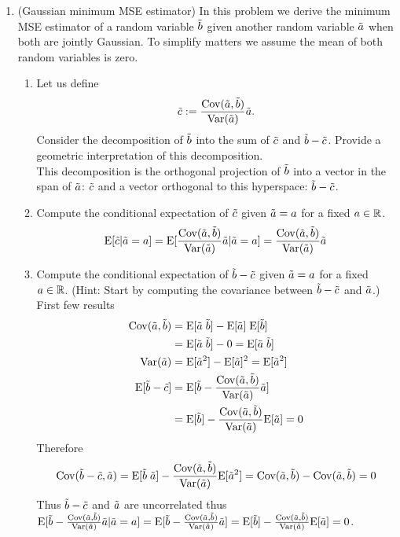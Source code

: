 \documentclass[12pt,twoside]{article}
\begin{document}
\begin{enumerate}
\begin{enumerate}
\begin{proof}
\end{proof}

\end{enumerate}

\item (Gaussian minimum MSE estimator) In this problem we derive the minimum MSE estimator of a random variable $\tilde{ b }$ given another random variable $\tilde{ a }$ when both are jointly Gaussian. To simplify matters we assume the mean of both random variables is zero. 
  \begin{enumerate}
  \item Let us define
  \begin{align}
  \rnd{c} := \frac{\cov(\ra,\rb)}{\var(\ra)}\ra.
  \end{align}
  Consider the decomposition of $\tilde{ b }$ into the sum of $\tilde{ c } $ and $\tilde{  b } - \tilde{ c }$. Provide a geometric interpretation of this decomposition. \\
  This decomposition is the orthogonal projection of $\tilde{ b }$ into a vector in the span of $\tilde{ a }$: $\tilde{ c }$ and a vector orthogonal to this hyperspace:  $\tilde{  b } - \tilde{ c }$.
  
  \item Compute the conditional expectation of $\tilde{ c } $ given $\tilde{  a }=a$ for a fixed $a \in \mathbb{R}$.
  $$\E[\rnd{c} | \rnd{a}= a] = \E[\frac{\cov(\ra,\rb)}{\var(\ra)}\ra | \ra= a] = \frac{\cov(\ra,\rb)}{\var(\ra)}\ra$$
  
  \item Compute the conditional expectation of $\tilde{  b } - \tilde{ c }$ given $\tilde{  a }=a$ for a fixed $a \in \mathbb{R}$. (Hint: Start by computing the covariance between $\tilde{  b } - \tilde{ c }$ and $\tilde{  a }$.)
  First few results
  \begin{align*}
  	\cov(\ra, \rb)	&=	 \E[\ra \; \rb]	- \E[\ra] \; \E[\rb]	\\
				&=	 \E[\ra \; \rb] - 0 = \E[\ra \; \rb] 		\\
	\var(\ra)		&=	 \E[\ra^2] - \E[\ra]^2 =  \E[\ra^2]		\\
	\E[\rb  - \rnd{c}]	&= 	 \E[ \rb  - \frac{\cov(\ra,\rb)}{\var(\ra)}\ra] \\
				&=	 \E[ \rb] - \frac{\cov(\ra,\rb)}{\var(\ra)} \E[\ra] = 0 
  \end{align*}
  Therefore $$\cov(\rb  - \rnd{c}, \ra)   = \E[ \rb  \; \ra] -  \frac{\cov(\ra,\rb)}{\var(\ra)} \E[\ra^2]  = \cov(\ra, \rb) - \cov(\ra, \rb) = 0$$
  Thus  $\tilde{  b }  - \tilde{ c }$ and $\tilde{  a }$ are uncorrelated thus $\E[ \rb - \frac{\cov(\ra,\rb)}{\var(\ra)} \ra | \ra= a ] = \E[ \rb - \frac{\cov(\ra,\rb)}{\var(\ra)} \ra] = \E[ \rb] -  \frac{\cov(\ra,\rb)}{\var(\ra)}  \E[\ra] = 0$.
  

\end{enumerate}
\end{enumerate}
\end{document}
